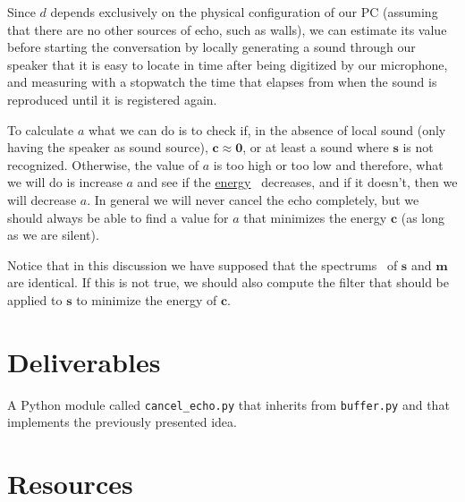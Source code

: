 Since $d$ depends exclusively on the physical configuration of our PC
(assuming that there are no other sources of echo, such as walls), we
can estimate its value before starting the conversation by locally
generating a sound through our speaker that it is easy to locate in
time after being digitized by our microphone, and measuring with a
stopwatch the time that elapses from when the sound is reproduced
until it is registered again.

To calculate $a$ what we can do is to check if, in the absence of
local sound (only having the speaker as sound source),
${\mathbf c}\approx{\mathbf 0}$, or at least a sound where
${\mathbf s}$ is not recognized. Otherwise, the value of $a$ is too
high or too low and therefore, what we will do is increase $a$ and see
if the
\href{https://en.wikipedia.org/wiki/Energy_(signal_processing)}{energy}~\cite{vetterli2014foundations}
decreases, and if it doesn't, then we will decrease $a$. In general we
will never cancel the echo completely, but we should always be able to
find a value for $a$ that minimizes the energy ${\mathbf c}$ (as long
as we are silent).

Notice that in this discussion we have supposed that the spectrums~\cite{kovacevic2013fourier,Oppenheim2} of
${\mathbf s}$ and ${\mathbf m}$ are identical. If this is not true, we
should also compute the filter that should be applied to ${\mathbf s}$ to
minimize the energy of ${\mathbf c}$.

\section{Deliverables}

A Python module called \texttt{cancel\_echo.py} that inherits from
\texttt{buffer.py} and that implements the previously presented idea.

\section{Resources}


